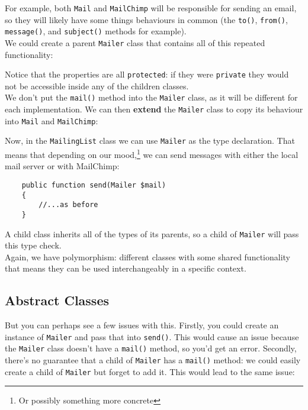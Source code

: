 For example, both \texttt{Mail} and \texttt{MailChimp} will be responsible for sending an email, so they will likely have some things behaviours in common (the \texttt{to()}, \texttt{from()}, \texttt{message()}, and \texttt{subject()} methods for example).
\\

We could create a parent \texttt{Mailer} class that contains all of this repeated functionality:


Notice that the properties are all \texttt{protected}: if they were \texttt{private} they would not be accessible inside any of the children classes.
\\

We don't put the \texttt{mail()} method into the \texttt{Mailer} class, as it will be different for each implementation. We can then \textbf{extend} the \texttt{Mailer} class to copy its behaviour into \texttt{Mail} and \texttt{MailChimp}:


\pagebreak

Now, in the \texttt{MailingList} class we can use \texttt{Mailer} as the type declaration. That means that depending on our mood,\footnote{Or possibly something more concrete} we can send messages with either the local mail server or with MailChimp:

\begin{verbatim}
    public function send(Mailer $mail)
    {
        //...as before
    }
\end{verbatim}

A child class inherits all of the types of its parents, so a child of \texttt{Mailer} will pass this type check.
\\

Again, we have polymorphism: different classes with some shared functionality that means they can be used interchangeably in a specific context.


\subsection{Abstract Classes}

But you can perhaps see a few issues with this. Firstly, you could create an instance of \texttt{Mailer} and pass that into \texttt{send()}. This would cause an issue because the \texttt{Mailer} class doesn't have a \texttt{mail()} method, so you'd get an error. Secondly, there's no guarantee that a child of \texttt{Mailer} has a \texttt{mail()} method: we could easily create a child of \texttt{Mailer} but forget to add it. This would lead to the same issue:

